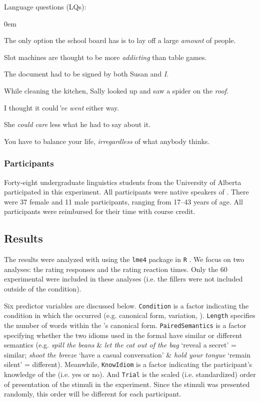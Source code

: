 \documentclass[output=paper
,modfonts
,nonflat]{langsci/langscibook}
\begin{document}
{\sc Language questions} (LQs):
\begin{enumerate}
\small{
\itemsep0em
\item The only option the school board has is to lay off a large \textit{amount} of people.
\item Slot machines are thought to be more \textit{addicting} than table games.
\item The document had to be signed by both Susan and \textit{I}.
\item While cleaning the kitchen, Sally looked up and saw a spider on the \textit{roof}.
\item I thought it could\textit{'ve went} either way.
\item She \textit{could care} less what he had to say about it.
\item You have to balance your life, \textit{irregardless} of what anybody thinks.
}
\end{enumerate}


\subsubsection{Participants}

Forty-eight undergraduate linguistics students from the University of Alberta participated in this experiment. All participants were native speakers of . There were 37 female and 11 male participants, ranging from 17--43 years of age. All participants were reimbursed for their time with course credit.


\subsection{Results}

The results were analyzed with  using the \texttt{lme4} package \citep{BatesEtAl2015} in \texttt{R} \citep{R}. We focus on two analyses: the rating responses and the rating reaction times. Only the 60 experimental  were included in these analyses (i.e. the fillers were not included outside of the   condition). %

Six predictor variables are discussed below. \texttt{Condition} is a factor indicating the condition in which the  occurred (e.g. canonical form,  variation,  ). \texttt{Length} specifies the number of words within the 's canonical form. \texttt{PairedSemantics} is a factor specifying whether the two idioms used in the formal   have similar or different semantics (e.g. \textit{spill the beans} \& \textit{let the cat out of the bag} `reveal a secret' = similar; \textit{shoot the breeze} `have a casual conversation' \& \textit{hold your tongue} `remain silent' = different). Meanwhile, \texttt{KnowIdiom} is a factor indicating the participant's knowledge of the  (i.e. yes or no). And \texttt{Trial} is the scaled (i.e. standardized) order of presentation of the stimuli in the experiment. Since the stimuli was presented randomly, this order will be different for each participant. 
\end{document}
